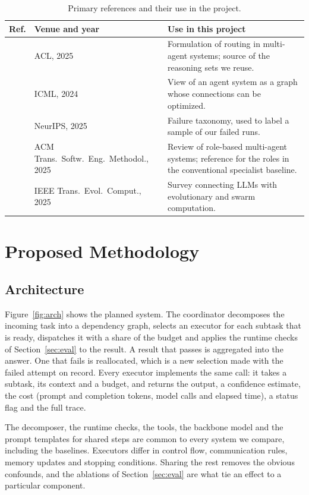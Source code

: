 \documentclass[11pt,a4paper]{article}
\newcommand{\head}[1]{\textbf{#1}}
\begin{document}
\begin{table}[h]
\centering\small
\caption{Primary references and their use in the project.}
\label{tab:primary}
\begin{tabularx}{\textwidth}{@{}P{0.8cm}P{4.6cm}L@{}}
\toprule
\head{Ref.} & \head{Venue and year} & \head{Use in this project} \\
\midrule
\cite{yue2025masrouter} & ACL, 2025 & Formulation of routing in multi-agent systems; source of the
reasoning sets we reuse. \\
\cite{zhuge2024gptswarm} & ICML, 2024 & View of an agent system as a graph whose connections can be
optimized. \\
\cite{cemri2025mast} & NeurIPS, 2025 & Failure taxonomy, used to label a sample of our failed runs. \\
\cite{he2025lma} & ACM Trans.\ Softw.\ Eng.\ Methodol., 2025 & Review of role-based multi-agent systems;
reference for the roles in the conventional specialist baseline. \\
\cite{wu2025ecllm} & IEEE Trans.\ Evol.\ Comput., 2025 & Survey connecting LLMs with evolutionary and swarm
computation. \\
\bottomrule
\end{tabularx}
\end{table}

\section{Proposed Methodology}

\subsection{Architecture}

Figure~\ref{fig:arch} shows the planned system. The coordinator decomposes the incoming task into a
dependency graph, selects an executor for each subtask that is ready, dispatches it with a share of the
budget and applies the runtime checks of Section~\ref{sec:eval} to the result. A result that passes is
aggregated into the answer. One that fails is reallocated, which is a new selection made with the failed
attempt on record. Every executor implements the same call: it takes a subtask, its context and a budget,
and returns the output, a confidence estimate, the cost (prompt and completion tokens, model calls and
elapsed time), a status flag and the full trace.

The decomposer, the runtime checks, the tools, the backbone model and the prompt templates for shared steps
are common to every system we compare, including the baselines. Executors differ in control flow,
communication rules, memory updates and stopping conditions. Sharing the rest removes the obvious
confounds, and the ablations of Section~\ref{sec:eval} are what tie an effect to a particular component.
\end{document}
